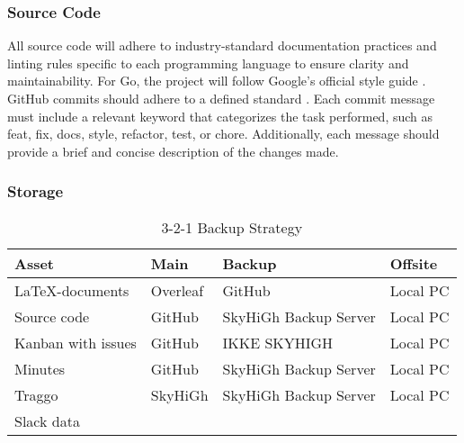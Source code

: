 \subsubsection{Source Code}  
All source code will adhere to industry-standard documentation practices and linting rules specific to each programming language to ensure clarity and maintainability. For Go, the project will follow Google's official style guide \cite{google_go_style}. \\

GitHub commits should adhere to a defined standard \cite{commit_standard}. Each commit message must include a relevant keyword that categorizes the task performed, such as feat, fix, docs, style, refactor, test, or chore. Additionally, each message should provide a brief and concise description of the changes made.

\subsubsection{Storage}

\begin{table} [H]
    \centering
    \begin{tabular}{|l|l|l|l|}
    \hline
    Asset & Main & Backup & Offsite \\
    \hline
    \LaTeX-documents & Overleaf & GitHub & Local PC \\
    Source code & GitHub & SkyHiGh Backup Server & Local PC \\
    Kanban with issues & GitHub & IKKE SKYHIGH & Local PC \\
    Minutes & GitHub & SkyHiGh Backup Server & Local PC \\
    Traggo & SkyHiGh & SkyHiGh Backup Server & Local PC \\
    Slack data & & & \\
    \hline
    \end{tabular}
    \caption{3-2-1 Backup Strategy}
    \label{tab:tools}
\end{table}


